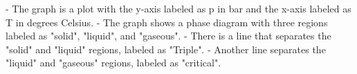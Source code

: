 - The graph is a plot with the y-axis labeled as p in bar and the x-axis labeled as T in degrees Celsius.
- The graph shows a phase diagram with three regions labeled as "solid", "liquid", and "gaseous".
- There is a line that separates the "solid" and "liquid" regions, labeled as "Triple".
- Another line separates the "liquid" and "gaseous" regions, labeled as "critical".